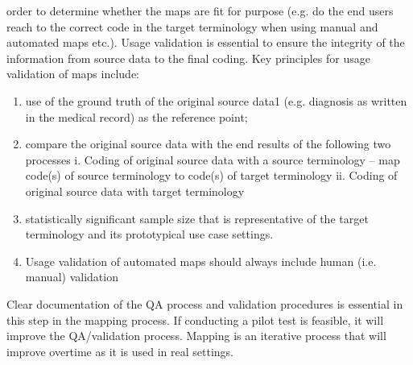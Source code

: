 \begin{enumerate}
order to determine whether the maps are fit for purpose (e.g. do the end users
reach to the correct code in the target terminology when using manual and
automated maps etc.). Usage validation is essential to ensure the integrity of the
information from source data to the final coding. Key principles for usage
validation of maps include:
\begin{enumerate}
\item use of the ground truth of the original source data1 (e.g. diagnosis as
written in the medical record) as the reference point;
\item compare the original source data with the end results of the following two
processes
\newline i. Coding of original source data with a source terminology – map
code(s) of source terminology to code(s) of target terminology
\newline ii. Coding of original source data with target terminology
\item statistically significant sample size that is representative of the target
terminology and its prototypical use case settings.
\item Usage validation of automated maps should always include human (i.e.
manual) validation
\end{enumerate}
Clear documentation of the QA process and validation procedures is essential
in this step in the mapping process.
If conducting a pilot test is feasible, it will improve the QA/validation process.
Mapping is an iterative process that will improve overtime as it is used in real
settings.


\end{enumerate}
